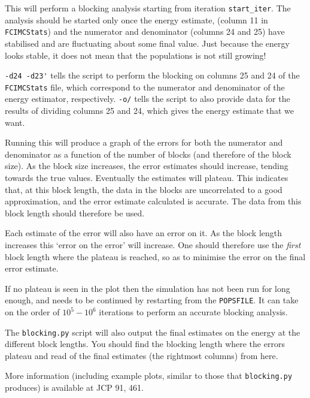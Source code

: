 \documentclass[a4paper,notitlepage,dvipsnames]{scrreprt}
\let\code\lstinline
\begin{document}
	This will perform a blocking analysis starting from iteration
	\code{start_iter}.
    The analysis should be started only once the energy estimate, (column 11 in
	\code{FCIMCStats}) and the numerator and denominator (columns 24 and
	25) have
    stabilised and are fluctuating about some final value. Just because the
    energy looks stable, it does not mean that the populations is not still
    growing!

	\code{-d24 -d23'} tells the script to perform the blocking on columns 25 and
	24 of the \code{FCIMCStats} file, which correspond to the numerator and
	denominator of the energy estimator, respectively. \code{-o/} tells the script
    to also provide data for the results of dividing columns 25 and 24, which
    gives the energy estimate that we want.

    Running this will produce a graph of the errors for both the numerator and
    denominator as a function of the number of blocks (and therefore of the
    block size). As the block size increases, the error estimates should
    increase, tending towards the true values. Eventually the estimates will
    plateau. This indicates that, at this block length, the data in the blocks
    are uncorrelated to a good approximation, and the error estimate calculated
    is accurate. The data from this block length should therefore be used.

    Each estimate of the error will also have an error on it. As the block
    length increases this `error on the error' will increase. One should
    therefore use the \emph{first} block length where the plateau is reached,
    so as to minimise the error on the final error estimate.

    If no plateau is seen in the plot then the simulation has not been run for
	long enough, and needs to be continued by restarting from the \code{POPSFILE}.
    It can take on the order of $10^5-10^6$ iterations to perform an accurate
    blocking analysis.

	The \code{blocking.py} script will also output the final estimates on the energy
    at the different block lengths. You should find the blocking length where
    the errors plateau and read of the final estimates (the rightmost columns)
    from here.

	More information (including example plots, similar to those that
	\code{blocking.py} produces) is available at JCP 91, 461.
\end{document}
